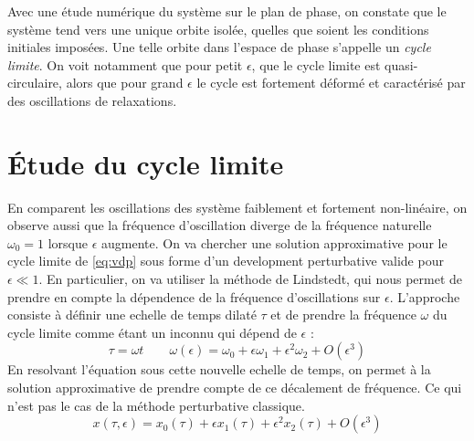 %
%
Avec une étude numérique du système sur le plan de phase, on constate que le système tend vers une unique orbite isolée, quelles que soient les conditions initiales imposées. 
Une telle orbite dans l'espace de phase s'appelle un \emph{cycle limite}. On voit notamment que pour petit $\epsilon$, que le cycle limite est quasi-circulaire, 
alors que pour grand $\epsilon$ le cycle est fortement déformé et caractérisé par des oscillations de relaxations.
%
\section{Étude du cycle limite}
%
En comparent les oscillations des système faiblement et fortement non-linéaire, on observe aussi que la fréquence d'oscillation diverge de la fréquence naturelle $\omega_0 = 1$ lorsque $\epsilon$ augmente. 
On va chercher une solution approximative pour le cycle limite de \eqref{eq:vdp} sous forme d'un development perturbative valide pour $\epsilon \ll 1$. En particulier, on va utiliser la méthode de Lindstedt, 
qui nous permet de prendre en compte la dépendence de la fréquence d'oscillations sur $\epsilon$. L'approche consiste à définir une echelle de temps dilaté $\tau$ et de prendre la fréquence $\omega$ du cycle limite comme étant un inconnu qui dépend de $\epsilon$ :
\begin{equation}
    \tau = \omega t
    \qquad
    \omega(\epsilon) = \omega_0 + \epsilon\omega_1 + \epsilon^2\omega_2 + O(\epsilon^3)
    \label{eq:omega_eps}
\end{equation}
%
En resolvant l'équation sous cette nouvelle echelle de temps, on permet à la solution approximative de prendre compte de ce décalement de fréquence.
Ce qui n'est pas le cas de la méthode perturbative classique.
\begin{equation}
    x(\tau, \epsilon) = x_0(\tau) + \epsilon x_1(\tau) + \epsilon^2 x_2(\tau) + O(\epsilon^3)
    \label{eq:x_eps}
\end{equation}
